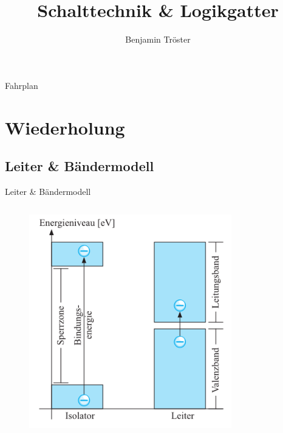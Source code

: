 \documentclass[12pt%
,aspectratio=169%
]{beamer}
\author{Benjamin Tröster}
\title[Schalttechnik \& Logikgatter]{Schalttechnik \& Logikgatter}
\institute[HTW Berlin]{Hochschule für Technik und Wirtschaft Berlin}
\begin{document}
\begin{frame}
\titlepage
\end{frame}

\begin{frame}{Fahrplan}
\tableofcontents[hideothersubsections]
\end{frame}

\section{Wiederholung}

\subsection{Leiter \& Bändermodell}
\begin{frame}{Leiter \& Bändermodell}
\begin{columns}[T] %
\begin{column}{.48\textwidth}
\vspace*{-0.2cm}
\begin{figure}
\center
\includegraphics[scale=.45]{pictures/baendermod}
\end{figure}
\end{column}%
\hfill%
\begin{column}{.48\textwidth}
\vspace*{-0.3cm}
\begin{figure}
\center

\end{figure}
\end{column}
\end{columns}
\end{frame}
\end{document}
